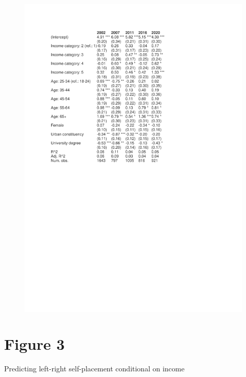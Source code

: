 \documentclass[12pt,letterpaper]{article}
\begin{document}
\begin{figure}
	\centering
	\includegraphics[width=1.5\linewidth]{tab_01.doc}
	\label{fig:tab01}
	
\end{figure}

\newpage
\section*{Figure 3} 
\vspace{.25cm}

 Predicting left-right self-placement conditional on income
\end{document}
